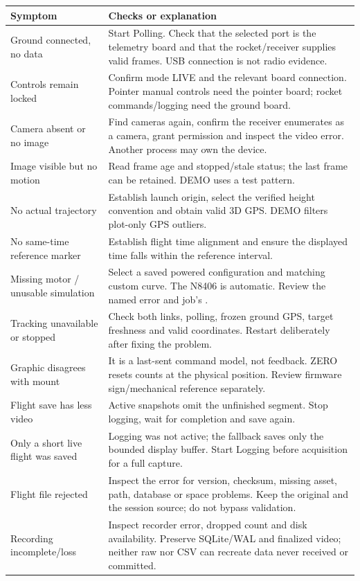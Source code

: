 \begin{longtable}{@{}L{.30\linewidth}L{.63\linewidth}@{}}
\toprule Symptom & Checks or explanation \\\midrule\endhead
Ground connected, no data & Start Polling. Check that the selected port is the telemetry board and that the rocket/receiver supplies valid frames. USB connection is not radio evidence. \\
Controls remain locked & Confirm mode LIVE and the relevant board connection. Pointer manual controls need the pointer board; rocket commands/logging need the ground board. \\
Camera absent or no image & Find cameras again, confirm the receiver enumerates as a camera, grant permission and inspect the video error. Another process may own the device. \\
Image visible but no motion & Read frame age and stopped/stale status; the last frame can be retained. DEMO uses a test pattern. \\
No actual trajectory & Establish launch origin, select the verified height convention and obtain valid 3D GPS. DEMO filters plot-only GPS outliers. \\
No same-time reference marker & Establish flight time alignment and ensure the displayed time falls within the reference interval. \\
Missing motor / unusable simulation & Select a saved powered configuration and matching custom curve. The N8406 is automatic. Review the named error and job's . \\
Tracking unavailable or stopped & Check both links, polling, frozen ground GPS, target freshness and valid coordinates. Restart deliberately after fixing the problem. \\
Graphic disagrees with mount & It is a last-sent command model, not feedback. ZERO resets counts at the physical position. Review firmware sign/mechanical reference separately. \\
Flight save has less video & Active snapshots omit the unfinished segment. Stop logging, wait for completion and save again. \\
Only a short live flight was saved & Logging was not active; the fallback saves only the bounded display buffer. Start Logging before acquisition for a full capture. \\
Flight file rejected & Inspect the error for version, checksum, missing asset, path, database or space problems. Keep the original and the session source; do not bypass validation. \\
Recording incomplete/loss & Inspect recorder error, dropped count and disk availability. Preserve SQLite/WAL and finalized video; neither raw nor CSV can recreate data never received or committed. \\
\bottomrule
\end{longtable}

